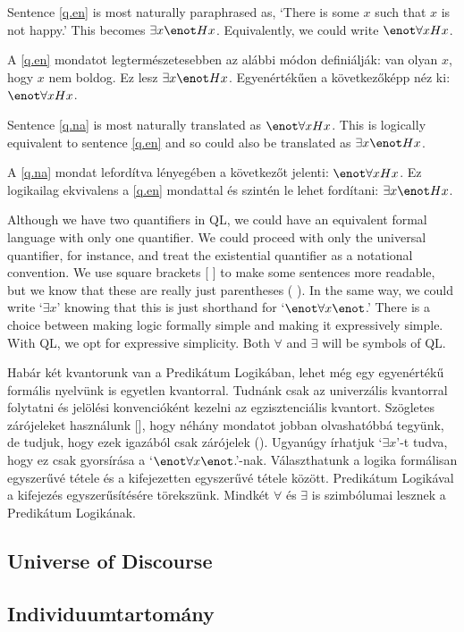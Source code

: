 Sentence \ref{q.en} is most naturally paraphrased as, `There is some $x$ such that $x$ is not happy.' This becomes $\exists x \enot Hx$. Equivalently, we could write $\enot\forall x Hx$.

A \ref{q.en} mondatot legtermészetesebben az alábbi módon definiálják: van olyan $x$, hogy $x$ nem boldog. Ez lesz $\exists x \enot Hx$. Egyenértékűen a következőképp néz ki: $\enot\forall x Hx$.

Sentence \ref{q.na} is most naturally translated as $\enot\forall xHx$. This is logically equivalent to sentence \ref{q.en} and so could also be translated as $\exists x \enot Hx$.

A \ref{q.na} mondat lefordítva lényegében a következőt jelenti: $\enot\forall xHx$. Ez logikailag ekvivalens a \ref{q.en} mondattal és szintén le lehet fordítani: $\exists x \enot Hx$.

Although we have two quantifiers in QL, we could have an equivalent formal language with only one quantifier. We could proceed with only the universal quantifier, for instance, and treat the existential quantifier as a notational convention. We use square brackets [ ] to make some sentences more readable, but we know that these are really just parentheses ( ). In the same way, we could write `$\exists x$' knowing that this is just shorthand for `$\enot \forall x \enot$.' There is a choice between making logic formally simple and making it expressively simple. With QL, we opt for expressive simplicity. Both $\forall$ and $\exists$ will be symbols of QL.

Habár két kvantorunk van a Predikátum Logikában, lehet még egy egyenértékű formális nyelvünk is egyetlen kvantorral. Tudnánk csak az univerzális kvantorral folytatni és jelölési konvencióként kezelni az egzisztenciális kvantort. Szögletes zárójeleket használunk [], hogy néhány mondatot jobban olvashatóbbá tegyünk, de tudjuk, hogy ezek igazából csak zárójelek (). Ugyanúgy írhatjuk `$\exists x$'-t tudva, hogy ez csak gyorsírása a `$\enot \forall x \enot$.'-nak. Választhatunk a logika formálisan egyszerűvé tétele és a kifejezetten egyszerűvé tétele között. Predikátum Logikával a kifejezés egyszerűsítésére törekszünk. Mindkét $\forall$ és $\exists$ is szimbólumai lesznek a Predikátum Logikának.

\subsection{Universe of Discourse}
\subsection{Individuumtartomány}

